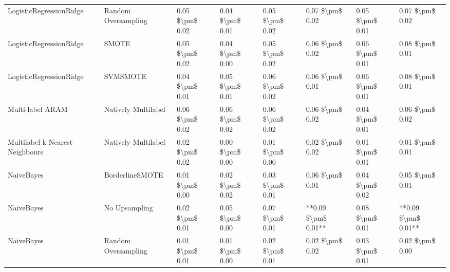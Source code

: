 \begin{tabular}{llllllll}
        LogisticRegressionRidge &           Random Oversampling & 0.05 \$\textbackslash pm\$ 0.02 &           0.04 \$\textbackslash pm\$ 0.01 &       0.05 \$\textbackslash pm\$ 0.02 &        0.07 \$\textbackslash pm\$ 0.02 &                         0.05 \$\textbackslash pm\$ 0.01 &     0.07 \$\textbackslash pm\$ 0.02 \\
        LogisticRegressionRidge &                         SMOTE & 0.05 \$\textbackslash pm\$ 0.02 &           0.04 \$\textbackslash pm\$ 0.00 &       0.05 \$\textbackslash pm\$ 0.02 &        0.06 \$\textbackslash pm\$ 0.02 &                         0.06 \$\textbackslash pm\$ 0.01 &     0.08 \$\textbackslash pm\$ 0.01 \\
        LogisticRegressionRidge &                      SVMSMOTE & 0.04 \$\textbackslash pm\$ 0.01 &           0.05 \$\textbackslash pm\$ 0.01 &       0.06 \$\textbackslash pm\$ 0.02 &        0.06 \$\textbackslash pm\$ 0.01 &                         0.06 \$\textbackslash pm\$ 0.01 &     0.08 \$\textbackslash pm\$ 0.01 \\
               Multi-label ARAM &           Natively Multilabel & 0.06 \$\textbackslash pm\$ 0.02 &           0.06 \$\textbackslash pm\$ 0.02 &       0.06 \$\textbackslash pm\$ 0.02 &        0.06 \$\textbackslash pm\$ 0.02 &                         0.04 \$\textbackslash pm\$ 0.01 &     0.06 \$\textbackslash pm\$ 0.02 \\
Multilabel k Nearest Neighbours &           Natively Multilabel & 0.02 \$\textbackslash pm\$ 0.02 &           0.00 \$\textbackslash pm\$ 0.00 &       0.01 \$\textbackslash pm\$ 0.00 &        0.02 \$\textbackslash pm\$ 0.02 &                         0.01 \$\textbackslash pm\$ 0.01 &     0.01 \$\textbackslash pm\$ 0.01 \\
                     NaiveBayes &               BorderlineSMOTE & 0.01 \$\textbackslash pm\$ 0.00 &           0.02 \$\textbackslash pm\$ 0.02 &       0.03 \$\textbackslash pm\$ 0.01 &        0.06 \$\textbackslash pm\$ 0.01 &                         0.04 \$\textbackslash pm\$ 0.02 &     0.05 \$\textbackslash pm\$ 0.01 \\
                     NaiveBayes &                 No Upsampling & 0.02 \$\textbackslash pm\$ 0.01 &           0.05 \$\textbackslash pm\$ 0.00 &       0.07 \$\textbackslash pm\$ 0.01 &    **0.09 \$\textbackslash pm\$ 0.01** &                         0.08 \$\textbackslash pm\$ 0.01 & **0.09 \$\textbackslash pm\$ 0.01** \\
                     NaiveBayes &           Random Oversampling & 0.01 \$\textbackslash pm\$ 0.01 &           0.01 \$\textbackslash pm\$ 0.00 &       0.02 \$\textbackslash pm\$ 0.01 &        0.02 \$\textbackslash pm\$ 0.02 &                         0.03 \$\textbackslash pm\$ 0.01 &     0.02 \$\textbackslash pm\$ 0.00 \\

\end{tabular}
